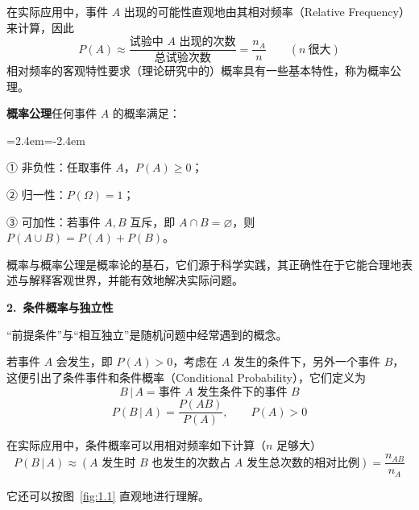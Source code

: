 \documentclass[11pt,openany,UTF8]{ctexbook}
\newcommand{\bhead}[1]{\par\medskip\noindent\textbf{#1}\par\smallskip}
\newenvironment{citemize}
  {\begin{list}{}{\leftmargin=2.4em\itemindent=-2.4em\itemsep=1pt\topsep=3pt\parsep=0pt}}
  {\end{list}}
\begin{document}
在实际应用中\nobreak，事件 $A$ 出现的可能性直观地由其相对频率（Relative Frequency\nobreak）来计算\nobreak，因此
\begin{equation}
P(A)\approx\frac{\text{试验中 }A\text{ 出现的次数}}{\text{总试验次数}}=\frac{n_A}{n}\qquad (n\ \text{很大})
\label{eq:1.1}
\end{equation}
相对频率的客观特性要求（理论研究中的\nobreak）概率具有一些基本特性\nobreak，称为概率公理\nobreak。

\noindent\textbf{概率公理}\quad 任何事件 $A$ 的概率满足\nobreak：

\begin{citemize}
  \item ① 非负性\nobreak：任取事件 $A$\nobreak，$P(A)\geqslant 0$\nobreak；
  \item ② 归一性\nobreak：$P(\Omega)=1$\nobreak；
  \item ③ 可加性\nobreak：若事件 $A,B$ 互斥\nobreak，即 $A\cap B=\varnothing$\nobreak，则 $P(A\cup B)=P(A)+P(B)$\nobreak。
\end{citemize}

概率与概率公理是概率论的基石\nobreak，它们源于科学实践\nobreak，其正确性在于它能合理地表述与解释客观世界\nobreak，并能有效地解决实际问题\nobreak。

\bhead{2.\ 条件概率与独立性}

“前提条件”与“相互独立”是随机问题中经常遇到的概念\nobreak。

若事件 $A$ 会发生\nobreak，即 $P(A)>0$\nobreak，考虑在 $A$ 发生的条件下\nobreak，另外一个事件 $B$\nobreak，这便引出了条件事件和条件概率（Conditional Probability\nobreak）\nobreak，它们定义为
\[
B\,|\,A=\text{事件 }A\text{ 发生条件下的事件 }B
\]
\begin{equation}
P(B\,|\,A)=\frac{P(AB)}{P(A)},\qquad P(A)>0
\label{eq:1.2}
\end{equation}

在实际应用中\nobreak，条件概率可以用相对频率如下计算（$n$ 足够大\nobreak）
\[
P(B\,|\,A)\approx (A\text{ 发生时 }B\text{ 也发生的次数占 }A\text{ 发生总次数的相对比例})=\frac{n_{AB}}{n_A}
\]

它还可以按图~\ref{fig:1.1} 直观地进行理解\nobreak。
\end{document}
